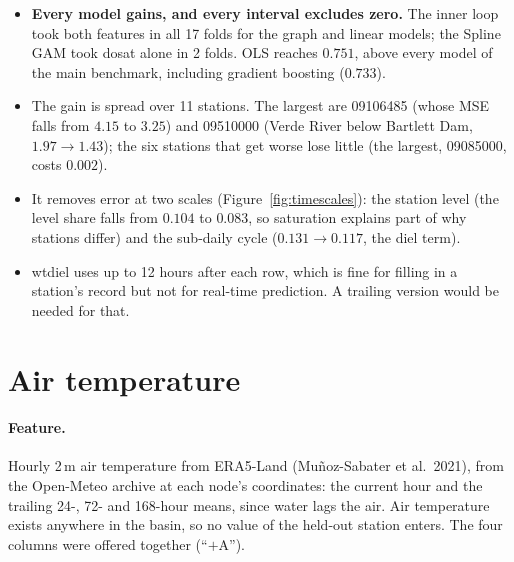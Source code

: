 \documentclass[11pt]{article}
\newcommand{\codeus}{\textunderscore\allowbreak}
\newcommand{\code}[1]{{\ttfamily\let\_\codeus #1}}
\begin{document}
\begin{itemize}
  \item \textbf{Every model gains, and every interval excludes zero.} The inner loop took both
        features in all 17 folds for the graph and linear models; the Spline GAM took
        \code{do\_sat} alone in 2 folds. OLS reaches $0.751$, above every model of the main
        benchmark, including gradient boosting ($0.733$).
  \item The gain is spread over 11 stations. The largest are 09106485 (whose MSE falls from
        $4.15$ to $3.25$) and 09510000 (Verde River below Bartlett Dam, $1.97\to1.43$); the
        six stations that get worse lose little (the largest, 09085000, costs $0.002$).
  \item It removes error at two scales (Figure~\ref{fig:timescales}): the station level (the
        level share falls from $0.104$ to $0.083$, so saturation explains part of why stations
        differ) and the sub-daily cycle ($0.131\to0.117$, the diel term).
  \item \code{wt\_diel} uses up to 12 hours after each row, which is fine for filling in a
        station's record but not for real-time prediction. A trailing version would be needed
        for that.
\end{itemize}

\section{Air temperature}\label{sec:airtemp}

\paragraph{Feature.} Hourly 2\,m air temperature from ERA5-Land (Mu\~noz-Sabater et al.\ 2021),
from the Open-Meteo archive at each node's coordinates: the current hour and the trailing 24-,
72- and 168-hour means, since water lags the air. Air temperature exists anywhere in the basin,
so no value of the held-out station enters. The four columns were offered together (``$+$A'').
\end{document}
